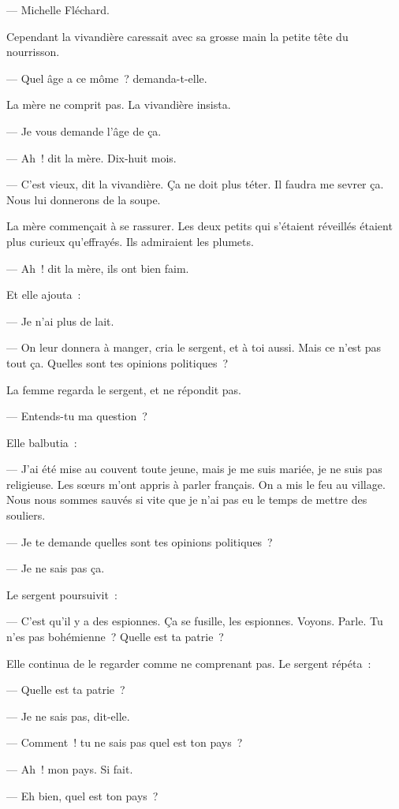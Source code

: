 \documentclass[french,twoside]{book} %
\begin{document}
— Michelle Fléchard.\par
Cependant la vivandière caressait avec sa grosse main la petite tête du nourrisson.\par
— Quel âge a ce môme ? demanda-t-elle.\par
La mère ne comprit pas. La vivandière insista.\par
— Je vous demande l’âge de ça.\par
— Ah ! dit la mère. Dix-huit mois.\par
— C’est vieux, dit la vivandière. Ça ne doit plus téter. Il faudra me sevrer ça. Nous lui donnerons de la soupe.\par
La mère commençait à se rassurer. Les deux petits qui s’étaient réveillés étaient plus curieux qu’effrayés. Ils admiraient les plumets.\par
— Ah ! dit la mère, ils ont bien faim.\par
Et elle ajouta :\par
— Je n’ai plus de lait.\par
— On leur donnera à manger, cria le sergent, et à toi aussi. Mais ce n’est pas tout ça. Quelles sont tes opinions politiques ?\par
La femme regarda le sergent, et ne répondit pas.\par
— Entends-tu ma question ?\par
Elle balbutia :\par
— J’ai été mise au couvent toute jeune, mais je  me suis mariée, je ne suis pas religieuse. Les sœurs m’ont appris à parler français. On a mis le feu au village. Nous nous sommes sauvés si vite que je n’ai pas eu le temps de mettre des souliers.\par
— Je te demande quelles sont tes opinions politiques ?\par
— Je ne sais pas ça.\par
Le sergent poursuivit :\par
— C’est qu’il y a des espionnes. Ça se fusille, les espionnes. Voyons. Parle. Tu n’es pas bohémienne ? Quelle est ta patrie ?\par
Elle continua de le regarder comme ne comprenant pas. Le sergent répéta :\par
— Quelle est ta patrie ?\par
— Je ne sais pas, dit-elle.\par
— Comment ! tu ne sais pas quel est ton pays ?\par
— Ah ! mon pays. Si fait.\par
— Eh bien, quel est ton pays ?\par
\end{document}
